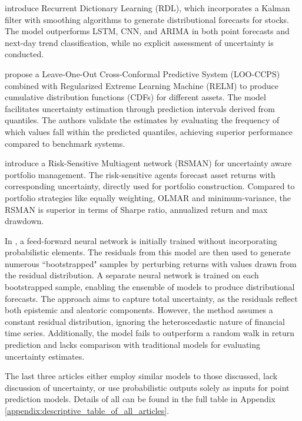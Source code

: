 \textcite{Sharma2021} introduce Recurrent Dictionary Learning (RDL), which incorporates a Kalman filter with smoothing algorithms to generate distributional forecasts for stocks. The model outperforms LSTM, CNN, and ARIMA in both point forecasts and next-day trend classification, while no explicit assessment of uncertainty is conducted.

\cite{wang2020fastconformal} propose a Leave-One-Out Cross-Conformal Predictive System (LOO-CCPS) combined with Regularized Extreme Learning Machine (RELM) to produce cumulative distribution functions (CDFs) for different assets. The model facilitates uncertainty estimation through prediction intervals derived from quantiles. The authors validate the estimates by evaluating the frequency of which values fall within the predicted quantiles, achieving superior performance compared to benchmark systems.


\cite{Park2024UncertaintyAware} introduce a Risk-Sensitive Multiagent network (RSMAN) for uncertainty aware portfolio management. The risk-sensitive agents forecast asset returns with corresponding uncertainty, directly used for portfolio construction. Compared to portfolio strategies like equally weighting, OLMAR and minimum-variance, the RSMAN is superior in terms of Sharpe ratio, annualized return and max drawdown. 

In \textcite{eriolu2020bootstrapped}, a feed-forward neural network is initially trained without incorporating probabilistic elements. The residuals from this model are then used to generate numerous ``bootstrapped" samples by perturbing returns with values drawn from the residual distribution. A separate neural network is trained on each bootstrapped sample, enabling the ensemble of models to produce distributional forecasts. The approach aims to capture total uncertainty, as the residuals reflect both epistemic and aleatoric components. However, the method assumes a constant residual distribution, ignoring the heteroscedastic nature of financial time series. Additionally, the model fails to outperform a random walk in return prediction and lacks comparison with traditional models for evaluating uncertainty estimates.

The last three articles \parencite{govindasamy2014prediction, Zhang2016, qin2016collective} either employ similar models to those discussed, lack discussion of uncertainty, or use probabilistic outputs solely as inputs for point prediction models. Details of all can be found in the full table in Appendix \ref{appendix:descriptive_table_of_all_articles}. 

